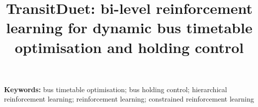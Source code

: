 \documentclass[10pt]{article}
\title{TransitDuet: bi-level reinforcement learning for dynamic bus timetable optimisation and holding control}
\author{}
\date{}
\begin{document}
\maketitle



{\small
\noindent\textbf{Keywords:} bus timetable optimisation; bus holding control; hierarchical reinforcement learning; reinforcement learning; constrained reinforcement learning
}










\appendix

\clearpage
\FloatBarrier



\end{document}
